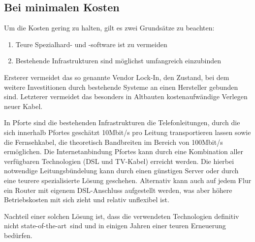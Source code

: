 \documentclass[10pt,a4paper,notitlepage]{scrartcl}
\newcommand{\gfo}{\grqq\ }
\newcommand{\gfu}{\glqq}
\begin{document}
\subsection{Bei minimalen Kosten}
\begin{multicols}{2}
Um die Kosten gering zu halten, gilt es zwei Grundsätze zu beachten:
\begin{enumerate}
\item Teure Spezialhard- und -software ist zu vermeiden
\item Bestehende Infrastrukturen sind möglichst umfangreich einzubinden
\end{enumerate}
Ersterer vermeidet das so genannte \gfu Vendor Lock-In\grqq, den Zustand, bei dem weitere Investitionen durch bestehende Systeme an einen Hersteller gebunden sind. Letzterer vermeidet das besonders in Altbauten kostenaufwändige Verlegen neuer Kabel.

In Pforte sind die bestehenden Infrastrukturen die Telefonleitungen, durch die sich innerhalb Pfortes geschätzt 10Mbit/s pro Leitung transportieren lassen sowie die Fernsehkabel, die theoretisch Bandbreiten im Bereich von 100Mbit/s ermöglichen. Die Internetanbindung Pfortes kann durch eine Kombination aller verfügbaren Technologien (DSL und TV-Kabel) erreicht werden. Die hierbei notwendige Leitungsbündelung kann durch einen günstigen Server oder durch eine teurere spezialisierte Lösung geschehen. Alternativ kann auch auf jedem Flur ein Router mit eigenem DSL-Anschluss aufgestellt werden, was aber höhere Betriebskosten mit sich zieht und relativ unflexibel ist.

Nachteil einer solchen Lösung ist, dass die verwendeten Technologien definitiv nicht \gfu state-of-the-art\gfo sind und in einigen Jahren einer teuren Erneuerung bedürfen.
\end{multicols}
\end{document}
